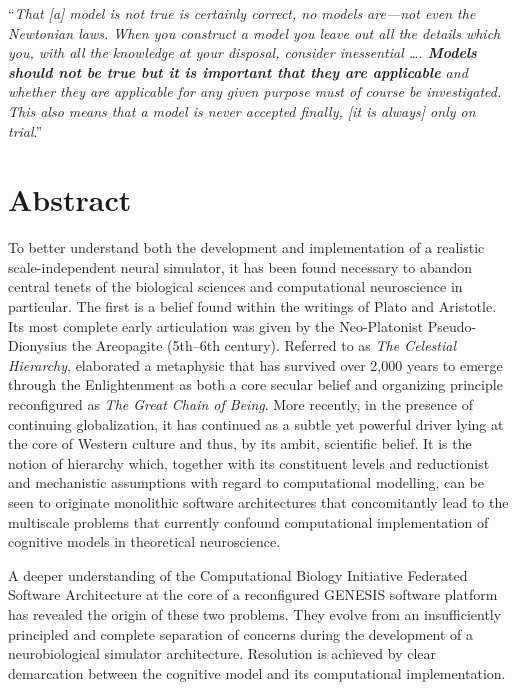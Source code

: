\documentclass[10pt,letterpaper]{article}
\begin{document}
\vspace*{\baselineskip}
\hspace*{0.025\textwidth}\begin{minipage}{0.8\textwidth}
\noindent ``\small{\textit{That \textnormal{[a]} model is not true is certainly correct, no models are—not even the Newtonian laws. When you construct a model you leave out all the details which you, with all the knowledge at your disposal, consider inessential \ldots. \textbf{Models should not be true but it is important that they are applicable} and whether they are applicable for any given purpose must of course be investigated. This also means that a model is never accepted finally, \textnormal{[it is always]} only on trial}.}''~\cite{rasch80}\\
\end{minipage}

\section*{Abstract}
To better understand both the development and implementation of a realistic scale-independent neural simulator, it has been found necessary to abandon central tenets of the biological sciences and computational neuroscience in particular. The first is a belief found within the writings of Plato and Aristotle. Its most complete early articulation was given by the Neo-Platonist Pseudo-Dionysius the Areopagite (5th--6th century). Referred to as {\it{The Celestial Hierarchy}}, elaborated a metaphysic that has survived over 2,000 years to emerge through the Enlightenment as both a core secular belief and organizing principle reconfigured as {\it{The Great Chain of Being}}. More recently, in the presence of continuing globalization, it has continued as a subtle yet powerful driver lying at the core of Western culture and thus, by its ambit, scientific belief. It is the notion of hierarchy which, together with its constituent levels and reductionist and mechanistic assumptions with regard to computational modelling, can be seen to originate monolithic software architectures that concomitantly lead to the multiscale problems that currently confound computational implementation of cognitive models in theoretical neuroscience.

A deeper understanding of the Computational Biology Initiative Federated Software Architecture at the core of a reconfigured GENESIS software platform has revealed the origin of these two problems. They evolve from an insufficiently principled and complete separation of concerns during the development of a neurobiological simulator architecture. Resolution is achieved by clear demarcation between the cognitive model and its computational implementation.
\end{document}
